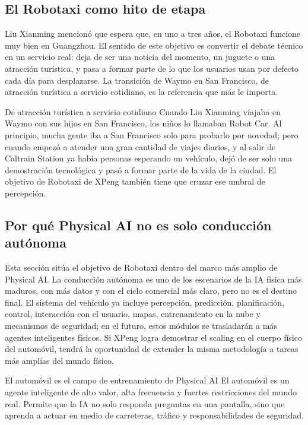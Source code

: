 \documentclass[a4paper]{article}
\begin{document}
\subsection{El Robotaxi como hito de etapa}

Liu Xianming mencionó que espera que, en uno a tres años, el Robotaxi funcione muy bien en Guangzhou. El sentido de este objetivo es convertir el debate técnico en un servicio real: deja de ser una noticia del momento, un juguete o una atracción turística, y pasa a formar parte de lo que los usuarios usan por defecto cada día para desplazarse. La transición de Waymo en San Francisco, de atracción turística a servicio cotidiano, es la referencia que más le importa.

\begin{knowledgebox}{De atracción turística a servicio cotidiano}
Cuando Liu Xianming viajaba en Waymo con sus hijos en San Francisco, los niños lo llamaban Robot Car. Al principio, mucha gente iba a San Francisco solo para probarlo por novedad; pero cuando empezó a atender una gran cantidad de viajes diarios, y al salir de Caltrain Station ya había personas esperando un vehículo, dejó de ser solo una demostración tecnológica y pasó a formar parte de la vida de la ciudad. El objetivo de Robotaxi de XPeng también tiene que cruzar ese umbral de percepción.
\end{knowledgebox}

\subsection{Por qué Physical AI no es solo conducción autónoma}

Esta sección sitúa el objetivo de Robotaxi dentro del marco más amplio de Physical AI. La conducción autónoma es uno de los escenarios de la IA física más maduros, con más datos y con el ciclo comercial más claro, pero no es el destino final. El sistema del vehículo ya incluye percepción, predicción, planificación, control, interacción con el usuario, mapas, entrenamiento en la nube y mecanismos de seguridad; en el futuro, estos módulos se trasladarán a más agentes inteligentes físicos. Si XPeng logra demostrar el scaling en el cuerpo físico del automóvil, tendrá la oportunidad de extender la misma metodología a tareas más amplias del mundo físico.

\begin{importantbox}{El automóvil es el campo de entrenamiento de Physical AI}
El automóvil es un agente inteligente de alto valor, alta frecuencia y fuertes restricciones del mundo real. Permite que la IA no solo responda preguntas en una pantalla, sino que aprenda a actuar en medio de carreteras, tráfico y responsabilidades de seguridad.
\end{importantbox}
\end{document}
